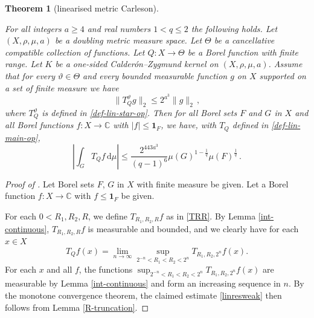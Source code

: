 \documentclass[10pt,a4paper]{article}
\theoremstyle{plain}
\newtheorem{theorem}{Theorem}[subsection]
\theoremstyle{definition}
\numberwithin{equation}{subsection}
\newcommand{\tQ}{{Q}}
\newcommand{\mfa}{{\vartheta}}
\newcommand{\Mf}{{\Theta}}
\newcommand{\lean}[1]{}
\newcommand{\proves}[1]{}
\newcommand{\uses}[1]{}
\newcommand{\leanok}{}
\def\C{\mathbb{C}}
\begin{document}
\begin{theorem}[linearised metric Carleson]
\label{linearised-metric-Carleson}
\uses{R-truncation,int-continuous}
\leanok
\lean{linearized_metric_carleson}
    For all integers $a \ge 4$ and real numbers $1<q\le 2$ the following holds.
    Let $(X,\rho,\mu,a)$ be a doubling metric measure space. Let $\Mf$ be a
    cancellative compatible collection of functions.
    Let $\tQ:X\to \Mf$ be a Borel function with finite range.
    Let $K$ be a one-sided Calder\'on--Zygmund kernel on $(X,\rho,\mu,a)$. Assume that for every $\mfa\in \Mf$ and every bounded measurable function $g$ on $X$ supported on a set of finite measure we have
    \begin{equation}\label{linnontanbound}
        \|T_{\tQ}^\mfa g\|_{2} \leq 2^{a^3} \|g\|_2\,,
    \end{equation}
    where $T_{\tQ}^\mfa$ is defined in \eqref{def-lin-star-op}.
    Then for all Borel sets $F$ and $G$ in $X$ and all Borel functions $f:X\to \C$ with
    $|f|\le \mathbf{1}_F$, we have, with $T_\tQ$ defined in \eqref{def-lin-main-op},
    \begin{equation}
        \label{linresweak}
        \left|\int_{G} T_\tQ f \, \mathrm{d}\mu\right| \le \frac{2^{443a^3}}{(q-1)^6} \mu(G)^{1-\frac{1}{q}} \mu(F)^{\frac{1}{q}}\, .
    \end{equation}
\end{theorem}

\begin{proof}[Proof of ]
\leanok
\proves{linearised-metric-Carleson}
Let Borel sets $F$, $G$ in $X$ with finite measure be given. Let a Borel function $f: X \to \mathbb{C}$ with $f \le \mathbf{1}_F$ be given.

For each $0 < R_1,R_2,R$, we define $T_{R_1,R_2,R}f$ as in \eqref{TRR}.
By Lemma \ref{int-continuous},
$T_{R_1,R_2,R}f$
is measurable and bounded, and we clearly have for each $x \in X$
\[
    T_Q f(x) = \lim_{n \to \infty} \sup_{2^{-n} < R_1 < R_2 < 2^n} T_{R_1, R_2, 2^n}f(x).
\]
For each $x$ and all $f$, the functions $\sup_{2^{-n} < R_1 < R_2 < 2^n} T_{R_1, R_2, 2^n} f(x)$ are measurable by Lemma \ref{int-continuous} and form an increasing sequence in $n$. By the monotone convergence theorem, the claimed estimate \eqref{linresweak} then follows from Lemma \ref{R-truncation}.
\end{proof}



\end{document}
